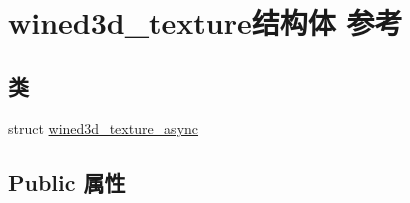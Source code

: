 \hypertarget{structwined3d__texture}{}\section{wined3d\+\_\+texture结构体 参考}
\label{structwined3d__texture}
\subsection*{类}
\begin{DoxyCompactItemize}
\item 
struct \hyperlink{structwined3d__texture_1_1wined3d__texture__async}{wined3d\+\_\+texture\+\_\+async}
\end{DoxyCompactItemize}
\subsection*{Public 属性}
